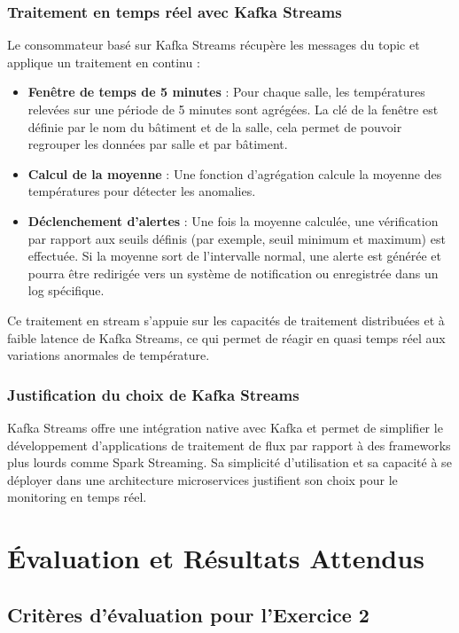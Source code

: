 \subsubsection{Traitement en temps réel avec Kafka Streams}
Le consommateur basé sur Kafka Streams récupère les messages du topic et applique un traitement en continu :
\begin{itemize}
    \item \textbf{Fenêtre de temps de 5 minutes} : Pour chaque salle, les températures relevées sur une période de 5 minutes sont agrégées.
    La clé de la fenêtre est définie par le nom du bâtiment et de la salle, cela permet de pouvoir regrouper les données par salle et par bâtiment.
    \item \textbf{Calcul de la moyenne} : Une fonction d’agrégation calcule la moyenne des températures pour détecter les anomalies.
    \item \textbf{Déclenchement d’alertes} : Une fois la moyenne calculée, une vérification par rapport aux seuils définis (par exemple, seuil minimum et maximum) est effectuée. Si la moyenne sort de l’intervalle normal, une alerte est générée et pourra être redirigée vers un système de notification ou enregistrée dans un log spécifique.
\end{itemize}

Ce traitement en stream s’appuie sur les capacités de traitement distribuées et à faible latence de Kafka Streams, ce qui permet de réagir en quasi temps réel aux variations anormales de température.

\subsubsection{Justification du choix de Kafka Streams}
Kafka Streams offre une intégration native avec Kafka et permet de simplifier le développement d’applications de traitement de flux par rapport à des frameworks plus lourds comme Spark Streaming. Sa simplicité d’utilisation et sa capacité à se déployer dans une architecture microservices justifient son choix pour le monitoring en temps réel.


\section{Évaluation et Résultats Attendus}

\subsection{Critères d’évaluation pour l’Exercice 2}

